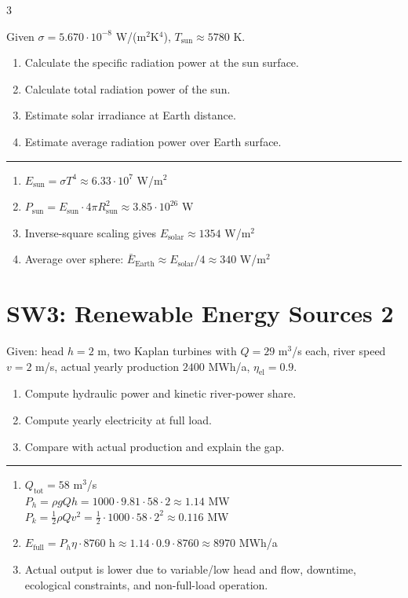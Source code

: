 \documentclass[9pt, landscape, a4paper]{article}
\newcommand{\hr}{\vspace{0.1cm}\par\vspace{-.5\ht\strutbox}\noindent\rule{\linewidth}{.5pt}\par\vspace{0.1cm}}
\begin{document}
\begin{multicols*}{3}
\begin{exercisebox}
  Given $\sigma=5.670\cdot10^{-8}$ W/(m$^2$K$^4$), $T_\text{sun}\approx5780$ K.
  \begin{enumerate}[label=\alph*.]
    \item Calculate the specific radiation power at the sun surface.
    \item Calculate total radiation power of the sun.
    \item Estimate solar irradiance at Earth distance.
    \item Estimate average radiation power over Earth surface.
  \end{enumerate}
  \hr
  \begin{enumerate}[label=\alph*.]
    \item $E_\text{sun}=\sigma T^4\approx6.33\cdot10^7$ W/m$^2$
    \item $P_\text{sun}=E_\text{sun}\cdot4\pi R_\text{sun}^2\approx3.85\cdot10^{26}$ W
    \item Inverse-square scaling gives $E_\text{solar}\approx1354$ W/m$^2$
    \item Average over sphere: $\bar E_\text{Earth}\approx E_\text{solar}/4\approx340$ W/m$^2$
  \end{enumerate}
\end{exercisebox}

\section{SW3: Renewable Energy Sources 2}
\begin{exercisebox}
  Given: head $h=2$ m, two Kaplan turbines with $Q=29$ m$^3$/s each,
  river speed $v=2$ m/s, actual yearly production $2400$ MWh/a, $\eta_\text{el}=0.9$.
  \begin{enumerate}[label=\alph*.]
    \item Compute hydraulic power and kinetic river-power share.
    \item Compute yearly electricity at full load.
    \item Compare with actual production and explain the gap.
  \end{enumerate}
  \hr
  \begin{enumerate}[label=\alph*.]
    \item $Q_\text{tot}=58$ m$^3$/s\\
      $P_h=\rho gQh=1000\cdot9.81\cdot58\cdot2\approx1.14$ MW\\
      $P_k=\frac12\rho Qv^2=\frac12\cdot1000\cdot58\cdot2^2\approx0.116$ MW
    \item $E_\text{full}=P_h\eta\cdot8760\text{ h}\approx1.14\cdot0.9\cdot8760\approx8970$ MWh/a
    \item Actual output is lower due to variable/low head and flow, downtime, ecological constraints, and non-full-load operation.
  \end{enumerate}
\end{exercisebox}


\end{multicols*}
\end{document}
